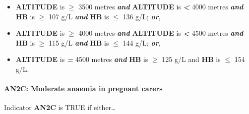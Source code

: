 \documentclass[12pt,a4paper]{article}
\let\oldparagraph\paragraph
\renewcommand{\paragraph}[1]{\oldparagraph{#1}\mbox{}}
\begin{document}
\begin{itemize}
\begin{itemize}
  \item
    \textbf{ALTITUDE} is \textbf{\emph{\(\geq\)}} 3500 metres \textbf{\emph{and}} \textbf{ALTITUDE} is \textbf{\emph{\textless{}}} 4000 metres \textbf{\emph{and}} \textbf{HB} is \textbf{\emph{\(\geq\)}} 107 g/L \textbf{\emph{and}} \textbf{HB} is \textbf{\emph{\(\leq\)}} 136 g/L; \textbf{\emph{or}},
  \item
    \textbf{ALTITUDE} is \textbf{\emph{\(\geq\)}} 4000 metres \textbf{\emph{and}} \textbf{ALTITUDE} is \textbf{\emph{\textless{}}} 4500 metres \textbf{\emph{and}} \textbf{HB} is \textbf{\emph{\(\geq\)}} 115 g/L \textbf{\emph{and}} \textbf{HB} is \textbf{\emph{\(\leq\)}} 144 g/L; \textbf{\emph{or}},
  \item
    \textbf{ALTITUDE} is \textbf{\emph{=}} 4500 metres \textbf{\emph{and}} \textbf{HB} is \textbf{\emph{\(\geq\)}} 125 g/L and \textbf{HB} is \textbf{\emph{\(\leq\)}} 154 g/L.
  \end{itemize}
\end{itemize}

\newpage

\hypertarget{an2c-moderate-anaemia-in-pregnant-carers}{%
\paragraph{AN2C: Moderate anaemia in pregnant carers}\label{an2c-moderate-anaemia-in-pregnant-carers}}

Indicator \textbf{AN2C} is TRUE if either\ldots{}
\end{document}
